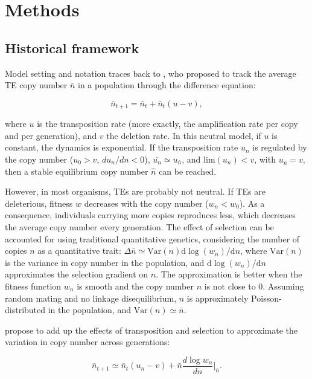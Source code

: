 \documentclass[10pt,a4paper]{article}
\begin{document}
\section{Methods}

\subsection{Historical framework}

Model setting and notation traces back to \cite{CC83}, who proposed to track the average TE copy number $\bar n$ in a population through the difference equation:

\begin{equation}
\bar n_{t+1} = \bar n_t + \bar n_t(u - v),
\end{equation}

\noindent where $u$ is the transposition rate (more exactly, the amplification rate per copy and per generation), and $v$ the deletion rate. 
In this neutral model, if $u$ is constant, the dynamics is exponential. If the transposition rate $u_n$ is regulated by the copy number ($u_0 > v$, $d u_n / d n < 0$), $\overline{u_n} \simeq u_{\bar n}$, and $\mathrm{lim} (u_n) < v$, with $u_{\hat n} = v$, then a stable equilibrium copy number $\hat n$ can be reached. 

However, in most organisms, TEs are probably not neutral. If TEs are deleterious, fitness $w$ decreases with the copy number ($w_n < w_0$). As a consequence, individuals carrying more copies reproduces less, which decreases the average copy number every generation. The effect of selection can be accounted for using traditional quantitative genetics, considering the number of copies $n$ as a quantitative trait: $\Delta \bar n \simeq \mathrm{Var}(n) \mathrm d \log(w_n)/ \mathrm d n$, where $\mathrm{Var}(n)$ is the variance in copy number in the population, and $\mathrm d \log(w_n)/ \mathrm d n$  approximates the selection gradient on $n$. The approximation is better when the fitness function $w_n$ is smooth and the copy number $n$ is not close to 0. Assuming random mating and no linkage disequilibrium, $n$ is approximately Poisson-distributed in the population, and $\mathrm{Var}(n) \simeq \bar n$. 

\cite{CC83} propose to add up the effects of transposition and selection to approximate the variation in copy number across generations:

\begin{equation}\label{eq:cc2}
\bar n_{t+1} \simeq \bar n_t(u_n - v) + \bar n \frac{d \log w_n}{d n} \Bigr|_{\bar n}.
\end{equation}
\end{document}
